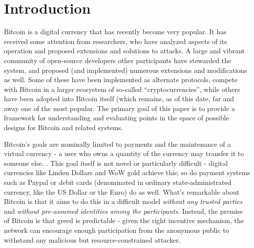 \section{Introduction}\label{intro}

Bitcoin is a digital currency that has recently become very popular.  It has received some attention from researchers, who have analyzed aspects of its operation and proposed extensions and solutions to attacks. A large and vibrant community of open-source developers other participants have stewarded the system, and proposed (and implemented) numerous extensions and modifications as well. Some of these have been implemented as alternate protocols, compete with Bitcoin in a larger ecosystem of so-called ``cryptocurrencies'', while others have been adopted into Bitcoin itself (which remains, as of this date, far and away one of the most popular. The primary goal of this paper is to provide a framework for understanding and evaluating points in the space of possible designs for Bitcoin and related systems.

Bitcoin's goals are nominally limited to payments and the maintenance of a virtual currency - a user who owns a quantity of the currency may transfer it to someone else. . This goal itself is not novel or particularly difficult - digital currencies like Linden Dollars and WoW gold achieve this; so do payment systems such as Paypal or debit cards (denominated in ordinary state-administrated currency, like the US Dollar or the Euro) do as well. What's remarkable about Bitcoin is that it aims to do this in a difficult model {\em without any trusted parties} and {\em without pre-assumed identities among the participants}. Instead, the premise of Bitcoin is that greed is predictable - given the right incentive mechanism, the network can encourage enough participation from the anonymous public to withstand any malicious but resource-constrained attacker. 

